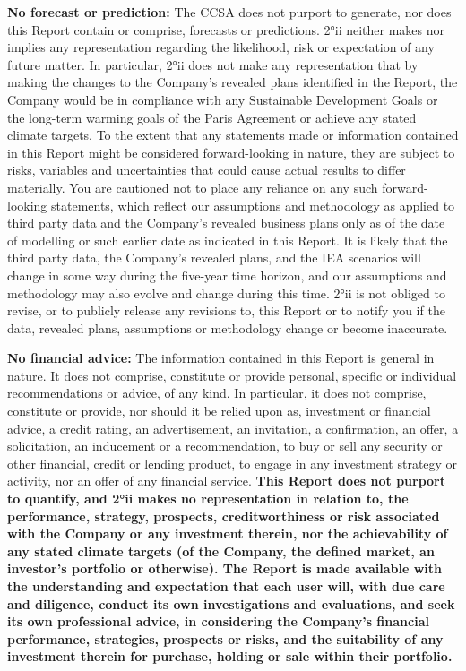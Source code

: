 \documentclass[10pt,table,a4]{article}\usepackage[]{graphicx}\usepackage[]{color}
\begin{document}
{		\textbf{No forecast or prediction:}
		The CCSA does not purport to generate, nor does this Report contain or comprise, forecasts or predictions. 2°ii neither makes nor implies any representation regarding the likelihood, risk or expectation of any future matter. In particular, 2°ii does not make any representation that by making the changes to the Company's revealed plans identified in the Report, the Company would be in compliance with any Sustainable Development Goals or the long-term warming goals of the Paris Agreement or achieve any stated climate targets. To the extent that any statements made or information contained in this Report might be considered forward-looking in nature, they are subject to risks, variables and uncertainties that could cause actual results to differ materially. You are cautioned not to place any reliance on any such forward-looking statements, which reflect our assumptions and methodology as applied to third party data and the Company's revealed business plans only as of the date of modelling or such earlier date as indicated in this Report. It is likely that the third party data, the Company's revealed plans, and the IEA scenarios will change in some way during the five-year time horizon, and our assumptions and methodology may also evolve and change during this time. 2°ii is not obliged to revise, or to publicly release any revisions to, this Report or to notify you if the data, revealed plans, assumptions or methodology change or become inaccurate.  
		
		\textbf{No financial advice:}
		The information contained in this Report is general in nature. It does not comprise, constitute or provide personal, specific or individual recommendations or advice, of any kind. In particular, it does not comprise, constitute or provide, nor should it be relied upon as, investment or financial advice, a credit rating, an advertisement, an invitation, a confirmation, an offer, a solicitation, an inducement or a recommendation, to buy or sell any security or other financial, credit or lending product, to engage in any investment strategy or activity, nor an offer of any financial service. \textbf{This Report does not purport to quantify, and 2°ii makes no representation in relation to, the performance, strategy, prospects, creditworthiness or risk associated with the Company or any investment therein, nor the achievability of any stated climate targets (of the Company, the defined market, an investor's portfolio or otherwise). The Report is made available with the understanding and expectation that each user will, with due care and diligence, conduct its own investigations and evaluations, and seek its own professional advice, in considering the Company's financial performance, strategies, prospects or risks, and the suitability of any investment therein for purchase, holding or sale within their portfolio.}
		
}
\end{document}
